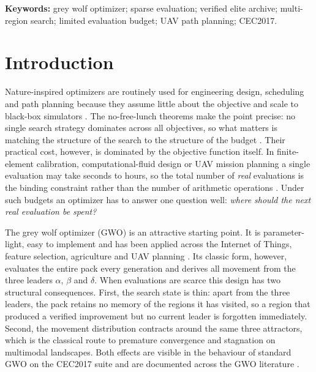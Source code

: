 \documentclass[11pt,a4paper]{article}
\begin{document}
\vspace{0.2cm}
\noindent\textbf{Keywords:} grey wolf optimizer; sparse evaluation; verified
elite archive; multi-region search; limited evaluation budget; UAV path
planning; CEC2017.

\section{Introduction}
\label{sec:intro}
Nature-inspired optimizers are routinely used for engineering design,
scheduling and path planning because they assume little about the objective
and scale to black-box simulators \citep{storn1997de,hansen2001cmaes,deb2002nsga2,yang2010bat}.
The no-free-lunch theorems make the point precise: no single search strategy
dominates across all objectives, so what matters is matching the structure of
the search to the structure of the budget \citep{wolpert2021nfl}. Their practical cost, however, is dominated
by the objective function itself. In finite-element calibration,
computational-fluid design or UAV mission planning a single evaluation may
take seconds to hours, so the total number of \emph{real} evaluations is the
binding constraint rather than the number of arithmetic operations
\citep{jones1998ego,jin2003fitness,jin2011surrogate,yu2021multimodel,liu2024survey,zhao2025surrogate}.
Under such budgets an optimizer has to answer one question well: \emph{where
should the next real evaluation be spent?}

The grey wolf optimizer (GWO) \citep{mirjalili2014gwo} is an attractive
starting point. It is parameter-light, easy to implement and has been applied
across the Internet of Things, feature selection, agriculture and UAV planning
\citep{nadimishahraki2024iot,makhadmeh2023review}. Its classic form, however,
evaluates the entire pack every generation and derives all movement from the
three leaders $\alpha$, $\beta$ and $\delta$. When evaluations are scarce this
design has two structural consequences. First, the search state is thin: apart
from the three leaders, the pack retains no memory of the regions it has
visited, so a region that produced a verified improvement but no current
leader is forgotten immediately. Second, the movement distribution contracts
around the same three attractors, which is the classical route to premature
convergence and stagnation on multimodal landscapes. Both effects are visible
in the behaviour of standard GWO on the CEC2017 suite and are documented across
the GWO literature \citep{makhadmeh2023review,nadimishahraki2024iot}.
\end{document}
